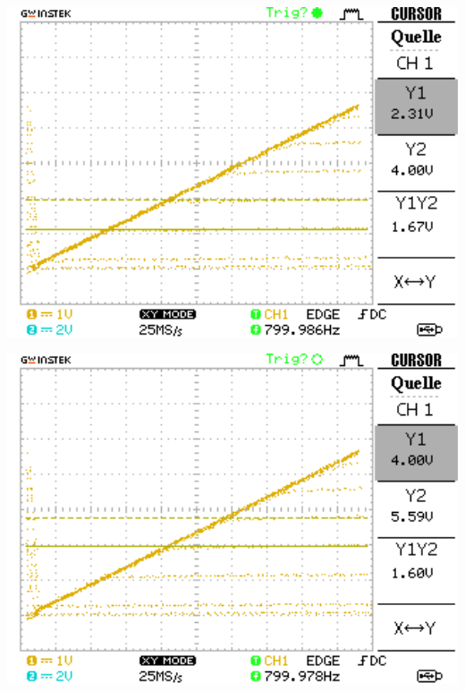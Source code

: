 \documentclass[10pt]{article}
\newenvironment{Figure}
  {\par\medskip\noindent\minipage{\linewidth}}
  {\endminipage\par\medskip}
\begin{document}
\begin{multicols}{2}
\begin{Figure}
		\label{fig:1.2}
	\end{Figure}
	\begin{Figure}
		\centering\includegraphics[width=1\textwidth]{../data/Kennlinie2_npn.png}
		\label{fig:1.3}
	\end{Figure}
	\begin{Figure}
		\centering\includegraphics[width=1\textwidth]{../data/Kennlinie3_npn.png}
		\label{fig:1.4}
	\end{Figure}
	\begin{Figure}

\end{Figure}
\end{multicols}
\end{document}
